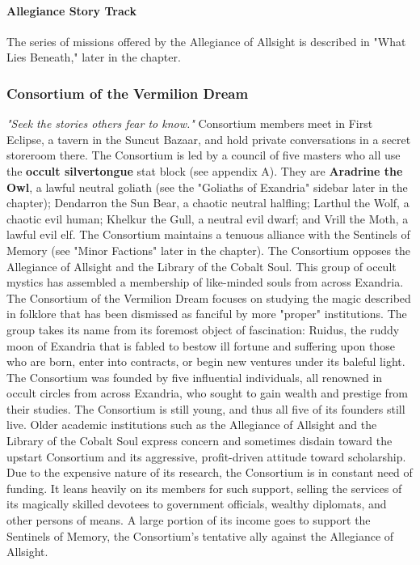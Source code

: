 \documentclass[10pt,a4,twoside,twocolumn,openany,nodeprecatedcode]{dndbook}
\begin{document}
\paragraph{Allegiance Story Track}
The series of missions offered by the Allegiance of Allsight is described in "What Lies Beneath," later in the chapter.
\subsubsection{Consortium of the Vermilion Dream}
\textit{"Seek the stories others fear to know."}
{{Consortium members meet in First Eclipse, a tavern in the Suncut Bazaar, and hold private conversations in a secret storeroom there.}}
{{The Consortium is led by a council of five masters who all use the \textbf{occult silvertongue} stat block (see appendix A). They are \textbf{Aradrine the Owl}, a lawful neutral goliath (see the "Goliaths of Exandria" sidebar later in the chapter); Dendarron the Sun Bear, a chaotic neutral halfling; Larthul the Wolf, a chaotic evil human; Khelkur the Gull, a neutral evil dwarf; and Vrill the Moth, a lawful evil elf.}}
{{The Consortium maintains a tenuous alliance with the Sentinels of Memory (see "Minor Factions" later in the chapter).}}
{{The Consortium opposes the Allegiance of Allsight and the Library of the Cobalt Soul.}}
This group of occult mystics has assembled a membership of like-minded souls from across Exandria. The Consortium of the Vermilion Dream focuses on studying the magic described in folklore that has been dismissed as fanciful by more "proper" institutions. The group takes its name from its foremost object of fascination: Ruidus, the ruddy moon of Exandria that is fabled to bestow ill fortune and suffering upon those who are born, enter into contracts, or begin new ventures under its baleful light.
The Consortium was founded by five influential individuals, all renowned in occult circles from across Exandria, who sought to gain wealth and prestige from their studies. The Consortium is still young, and thus all five of its founders still live. Older academic institutions such as the Allegiance of Allsight and the Library of the Cobalt Soul express concern and sometimes disdain toward the upstart Consortium and its aggressive, profit-driven attitude toward scholarship.
Due to the expensive nature of its research, the Consortium is in constant need of funding. It leans heavily on its members for such support, selling the services of its magically skilled devotees to government officials, wealthy diplomats, and other persons of means. A large portion of its income goes to support the Sentinels of Memory, the Consortium's tentative ally against the Allegiance of Allsight.
\end{document}
